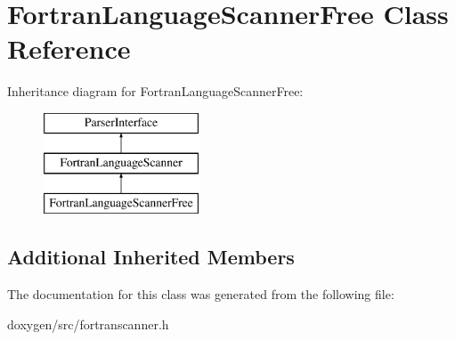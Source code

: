 \hypertarget{class_fortran_language_scanner_free}{}\section{Fortran\+Language\+Scanner\+Free Class Reference}
\label{class_fortran_language_scanner_free}
Inheritance diagram for Fortran\+Language\+Scanner\+Free\+:\begin{figure}[H]
\begin{center}
\leavevmode
\includegraphics[height=3.000000cm]{class_fortran_language_scanner_free}
\end{center}
\end{figure}
\subsection*{Additional Inherited Members}


The documentation for this class was generated from the following file\+:\begin{DoxyCompactItemize}
\item 
doxygen/src/fortranscanner.\+h\end{DoxyCompactItemize}

